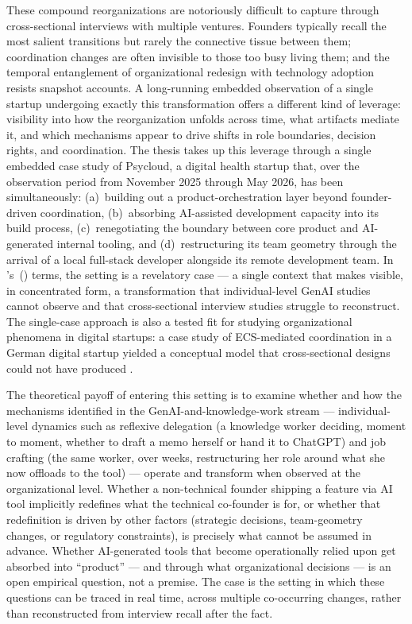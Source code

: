 \documentclass[11pt,a4paper]{article}
\newcommand{\citepos}[1]{\citeauthor{#1}'s~(\citeyear{#1})}
\begin{document}
These compound reorganizations are notoriously difficult to capture through cross-sectional interviews with multiple ventures. Founders typically recall the most salient transitions but rarely the connective tissue between them; coordination changes are often invisible to those too busy living them; and the temporal entanglement of organizational redesign with technology adoption resists snapshot accounts. A long-running embedded observation of a single startup undergoing exactly this transformation offers a different kind of leverage: visibility into how the reorganization unfolds across time, what artifacts mediate it, and which mechanisms appear to drive shifts in role boundaries, decision rights, and coordination. The thesis takes up this leverage through a single embedded case study of Psycloud, a digital health startup that, over the observation period from November 2025 through May 2026, has been simultaneously: (a)~building out a product-orchestration layer beyond founder-driven coordination, (b)~absorbing AI-assisted development capacity into its build process, (c)~renegotiating the boundary between core product and AI-generated internal tooling, and (d)~restructuring its team geometry through the arrival of a local full-stack developer alongside its remote development team. In \citepos{yin2018case} terms, the setting is a revelatory case --- a single context that makes visible, in concentrated form, a transformation that individual-level GenAI studies cannot observe and that cross-sectional interview studies struggle to reconstruct. The single-case approach is also a tested fit for studying organizational phenomena in digital startups: a case study of ECS-mediated coordination in a German digital startup yielded a conceptual model that cross-sectional designs could not have produced \citep{eggert2024ecs}.

The theoretical payoff of entering this setting is to examine whether and how the mechanisms identified in the GenAI-and-knowledge-work stream \citep{clarke2025beyond,law2025generative,mayer2025generation,ulloa2025product} --- individual-level dynamics such as reflexive delegation (a knowledge worker deciding, moment to moment, whether to draft a memo herself or hand it to ChatGPT) and job crafting (the same worker, over weeks, restructuring her role around what she now offloads to the tool) --- operate and transform when observed at the organizational level. Whether a non-technical founder shipping a feature via AI tool implicitly redefines what the technical co-founder is for, or whether that redefinition is driven by other factors (strategic decisions, team-geometry changes, or regulatory constraints), is precisely what cannot be assumed in advance. Whether AI-generated tools that become operationally relied upon get absorbed into ``product'' --- and through what organizational decisions --- is an open empirical question, not a premise. The case is the setting in which these questions can be traced in real time, across multiple co-occurring changes, rather than reconstructed from interview recall after the fact.
\end{document}
